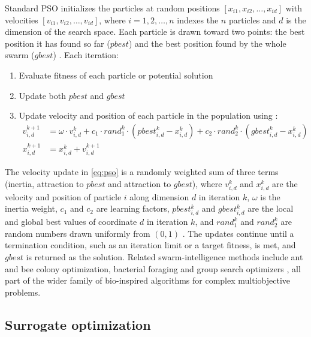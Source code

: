 \documentclass[final,3p,times]{elsarticle}
\begin{document}
Standard PSO initializes the particles at random positions $[x_{i1}, x_{i2}, \dots, x_{id}]$ with velocities $[v_{i1}, v_{i2}, \dots, v_{id}]$, where $i = 1, 2, \dots, n$ indexes the $n$ particles and $d$ is the dimension of the search space. Each particle is drawn toward two points: the best position it has found so far ($pbest$) and the best position found by the whole swarm ($gbest$) \cite{borhanazad2014}. Each iteration:

\begin{enumerate}
    \item Evaluate fitness of each particle or potential solution
    \item Update both $pbest$ and $gbest$
    \item Update velocity and position of each particle in the population using \cite{wu2014}:
    \begin{align}
    \label{eq:pso}
        v_{i,d}^{k+1} & = \omega \cdot v_{i,d}^{k} + c_1 \cdot rand_1^k \cdot (pbest_{i,d}^k - x_{i,d}^{k}) + c_2 \cdot rand_2^k \cdot (gbest_{i,d}^k - x_{i,d}^k) \\
        x_{i,d}^{k+1} & = x_{i,d}^{k} + v_{i,d}^{k+1}
    \end{align}
\end{enumerate}

The velocity update in \cref{eq:pso} is a randomly weighted sum of three terms (inertia, attraction to $pbest$ and attraction to $gbest$), where $v_{i,d}^k$ and $x_{i,d}^k$ are the velocity and position of particle $i$ along dimension $d$ in iteration $k$, $\omega$ is the inertia weight, $c_1$ and $c_2$ are learning factors, $pbest_{i,d}^k$ and $gbest_{i,d}^k$ are the local and global best values of coordinate $d$ in iteration $k$, and $rand_1^k$ and $rand_2^k$ are random numbers drawn uniformly from $(0,1)$ \cite{wu2014}. The updates continue until a termination condition, such as an iteration limit or a target fitness, is met, and $gbest$ is returned as the solution. Related swarm-intelligence methods include ant and bee colony optimization, bacterial foraging and group search optimizers \cite{pathak2017}, all part of the wider family of bio-inspired algorithms for complex multiobjective problems.

\subsection{Surrogate optimization}
\end{document}

